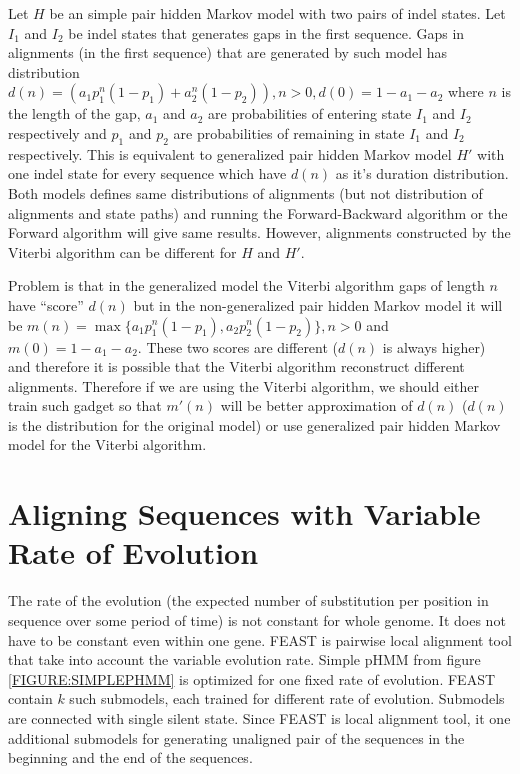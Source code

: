 Let $H$ be an simple pair hidden Markov model with two pairs of indel states.
Let $I_1$ and $I_2$ be indel states that generates gaps in the first sequence.
Gaps in alignments (in the first sequence) that are generated by such model has
distribution $d(n)=(a_1p_1^n(1-p_1)+a_2^n(1-p_2)), n>0, d(0)=1-a_1-a_2$ where
$n$ is the length of the gap, $a_1$ and $a_2$ are probabilities of entering
state $I_1$ and $I_2$ respectively and $p_1$ and $p_2$ are probabilities of
remaining in state $I_1$ and $I_2$ respectively. This is equivalent to
generalized pair hidden Markov model $H'$ with one indel state for every
sequence which have $d(n)$ as it's duration distribution. Both models defines
same distributions of alignments (but not distribution of alignments and state
paths) and running the Forward-Backward algorithm or the Forward algorithm will 
give same results. However, alignments constructed by the Viterbi algorithm
can be different for $H$ and $H'$.

Problem is that in the generalized model the Viterbi algorithm gaps of length
$n$ have ``score'' $d(n)$ but in the non-generalized pair hidden Markov model it
will be $m(n)=\max\{a_1p_1^n(1-p_1),a_2p_2^n(1-p_2)\}, n>0$ and
$m(0)=1-a_1-a_2$.  These two scores are different ($d(n)$ is always higher) and
therefore it is possible that the Viterbi algorithm reconstruct different
alignments. Therefore if we are using the Viterbi algorithm, we should either
train such gadget so that $m'(n)$ will be better approximation of $d(n)$ ($d(n)$
is the distribution for the original model) or use generalized pair hidden
Markov model for the Viterbi algorithm.


\section{Aligning Sequences with Variable Rate of Evolution}
 

The rate of the evolution (the expected number of substitution per position in
sequence over some period of time) is not constant for whole genome. It does not
have to be constant even within one gene. FEAST is pairwise local alignment tool
\cite{FEAST2011} that take into account the variable evolution rate. Simple pHMM
from figure \ref{FIGURE:SIMPLEPHMM} is optimized for one fixed rate of
evolution.  FEAST contain $k$ such submodels, each trained for different rate of
evolution.  Submodels are connected with single silent state.  Since FEAST is
local alignment tool, it one additional submodels for generating unaligned pair
of the sequences in the beginning and the end of the sequences.

